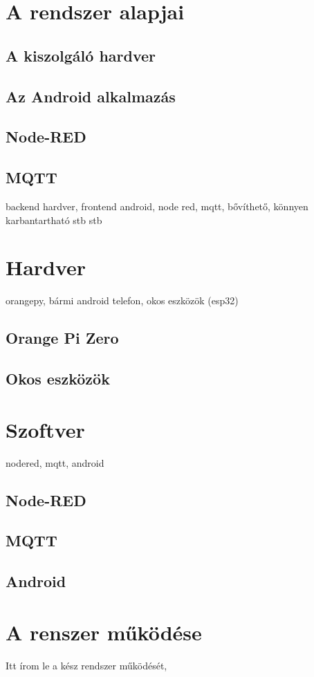 \documentclass[
]{thesis-ekf}
\theoremstyle{definition}
\theoremstyle{remark}
\begin{document}
\chapter{A rendszer alapjai}
\section{A kiszolgáló hardver}
\section{Az Android alkalmazás}
\section{Node-RED}
\section{MQTT}
backend hardver, frontend android, node red, mqtt, bővíthető, könnyen karbantartható stb stb

\chapter{Hardver}
orangepy, bármi android telefon, okos eszközök (esp32)
\section{Orange Pi Zero}
\section{Okos eszközök}

\chapter{Szoftver}
nodered, mqtt, android
\section{Node-RED}
\section{MQTT}
\section{Android}

\chapter{A renszer működése}
Itt írom le a kész rendszer működését, 
\end{document}
